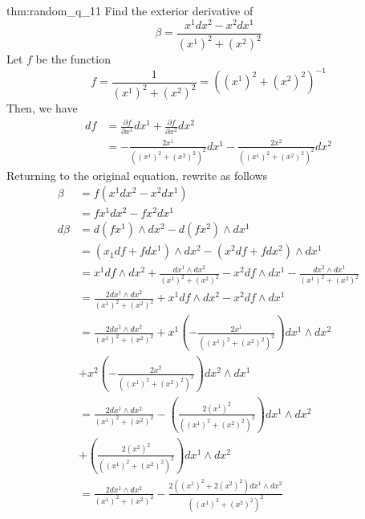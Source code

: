 \documentclass[landscape, 8pt]{extarticle}
\begin{document}
\begin{multicols}{3}
\begin{thm}[random q]{thm:random_q_1}{1}
    Find the exterior derivative of
    \[\beta = \frac{x^{1}dx^{2} - x^{2}dx^{1}}{(x^{1})^{2} + (x^{2})^{2}}\]
    Let \(f\) be the function 
    \[\displaystyle f = \frac{1}{(x^{1})^{2} + (x^{2})^{2}} = ((x^{1})^{2} + (x^{2})^{2})^{-1}\]
    Then, we have 
    \begin{align*}
        df &= \displaystyle\frac{\partial f}{\partial x^{1}}dx^{1} + \frac{\partial f}{\partial x^{2}} dx^{2} \\
        &= - \frac{2x^{1}}{((x^{1})^{2} + (x^{2})^{2})^{2}}dx^{1} - \frac{2x^{2}}{((x^{1})^{2} + (x^{2})^{2})^{2}}dx^{2}
    \end{align*}
    Returning to the original equation, rewrite as follows
    \begin{align*}
        \beta &= f(x^{1}dx^{2} - x^{2}dx^{1}) \\
        &= fx^{1}dx^{2} - fx^{2}dx^{1} \\
        d\beta &= d(fx^{1}) \wedge dx^{2} - d(fx^{2}) \wedge dx^{1} \\
        &= (x_{1}df + fdx^{1}) \wedge dx^{2} - (x^{2}df + fdx^{2}) \wedge dx^{1} \\
        &= x^{1}df\wedge dx^{2} + \frac{dx^{1}\wedge dx^{2}}{(x^{1})^{2} + (x^{2})^{2}} - x^{2}df\wedge dx^{1} - \frac{dx^{2}\wedge dx^{1}}{(x^{1})^{2} + (x^{2})^{2}} \\
        &= \frac{2dx^{1}\wedge dx^{2}}{(x^{1})^{2} + (x^{2})^{2}} + x^{1}df\wedge dx^{2} - x^{2}df\wedge dx^{1} \\
        &= \frac{2dx^{1}\wedge dx^{2}}{(x^{1})^{2} + (x^{2})^{2}} + x^{1} \left(- \frac{2x^{1}}{((x^{1})^{2} + (x^{2})^{2})^{2}}\right)dx^{1} \wedge dx^{2} \\
        &+ x^{2} \left(- \frac{2x^{2}}{((x^{1})^{2} + (x^{2})^{2})^{2}}\right)dx^{2} \wedge dx^{1} \\
        &= \frac{2dx^{1}\wedge dx^{2}}{(x^{1})^{2} + (x^{2})^{2}} -  \left(\frac{2(x^{1})^{2}}{((x^{1})^{2} + (x^{2})^{2})^{2}}\right)dx^{1} \wedge dx^{2} \\
        &+ \left(\frac{2(x^{2})^{2}}{((x^{1})^{2} + (x^{2})^{2})^{2}}\right)dx^{1} \wedge dx^{2} \\
        &= \frac{2dx^{1}\wedge dx^{2}}{(x^{1})^{2} + (x^{2})^{2}} -  \frac{2((x^{1})^{2} + 2(x^{2})^{2})dx^{1} \wedge dx^{2}}{((x^{1})^{2} + (x^{2})^{2})^{2}} \\ 
    \end{align*}
    

\end{thm}
\vspace{-5pt}




\end{multicols}
\end{document}
